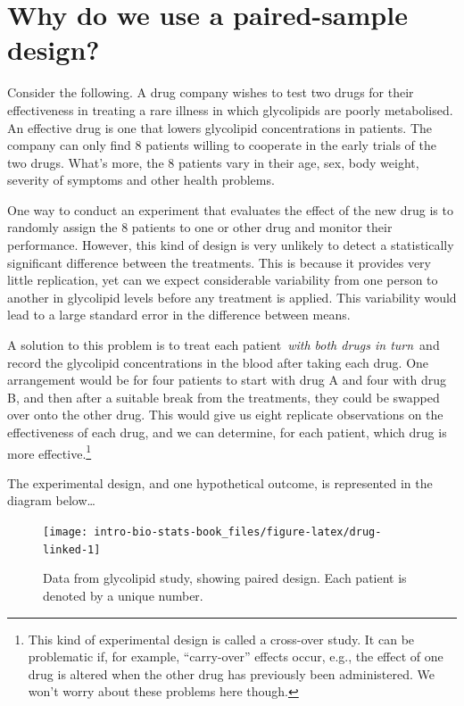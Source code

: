 \documentclass[
]{book}
\begin{document}
\hypertarget{why-do-we-use-a-paired-sample-design}{%
\section{Why do we use a paired-sample design?}\label{why-do-we-use-a-paired-sample-design}}

Consider the following. A drug company wishes to test two drugs for their effectiveness in treating a rare illness in which glycolipids are poorly metabolised. An effective drug is one that lowers glycolipid concentrations in patients. The company can only find 8 patients willing to cooperate in the early trials of the two drugs. What's more, the 8 patients vary in their age, sex, body weight, severity of symptoms and other health problems.

One way to conduct an experiment that evaluates the effect of the new drug is to randomly assign the 8 patients to one or other drug and monitor their performance. However, this kind of design is very unlikely to detect a statistically significant difference between the treatments. This is because it provides very little replication, yet can we expect considerable variability from one person to another in glycolipid levels before any treatment is applied. This variability would lead to a large standard error in the difference between means.

A solution to this problem is to treat each patient~\emph{with both drugs in turn}~and record the glycolipid concentrations in the blood after taking each drug. One arrangement would be for four patients to start with drug A and four with drug B, and then after a suitable break from the treatments, they could be swapped over onto the other drug. This would give us eight replicate observations on the effectiveness of each drug, and we can determine, for each patient, which drug is more effective.\footnote{This kind of experimental design is called a cross-over study. It can be problematic if, for example, ``carry-over'' effects occur, e.g., the effect of one drug is altered when the other drug has previously been administered. We won't worry about these problems here though.}

The experimental design, and one hypothetical outcome, is represented in the diagram below\ldots{}

\begin{figure}

{\centering \texttt{[image: intro-bio-stats-book\_files/figure-latex/drug-linked-1]} 

}

\caption{Data from glycolipid study, showing paired design. Each patient is denoted by a unique number.}\label{fig:drug-linked}
\end{figure}
\end{document}
